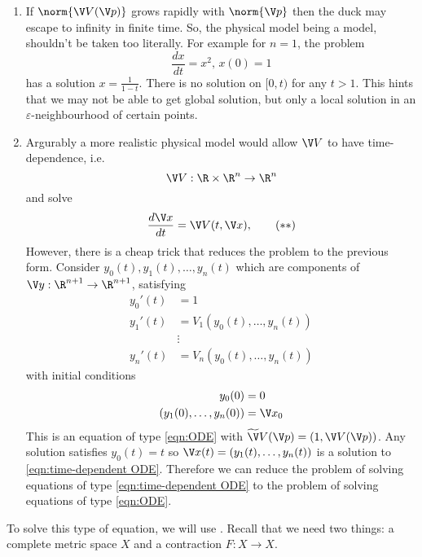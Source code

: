 \documentclass[a4paper]{article}
\theoremstyle{definition}
\begin{document}
\begin{remark}\leavevmode
  \begin{enumerate}
  \item If \(\norm{\V V(\V p)}\) grows rapidly with \(\norm{\V p}\) then the duck may escape to infinity in finite time. So, the physical model being a model, shouldn't be taken too literally. For example for \(n = 1\), the problem
    \[
      \frac{dx}{dt} = x^2, \, x(0) = 1
    \]
    has a solution \(x = \frac{1}{1 - t}\). There is no solution on \([0, t)\) for any \(t > 1\). This hints that we may not be able to get global solution, but only a local solution in an \(\varepsilon\)-neighbourhood of certain points.
  \item Argurably a more realistic physical model would allow \(\V V\) to have time-dependence, i.e.
    \[
      \V V: \R \times \R^n \to \R^n
    \]
    and solve
    \begin{equation*}
      \label{eqn:time-dependent ODE}
      \frac{d \V x}{dt} = \V V(t, \V x),
      \tag{\(\ast\ast\)}
    \end{equation*}
    However, there is a cheap trick that reduces the problem to the previous form. Consider \(y_0(t), y_1(t), \dots, y_n(t)\) which are components of \(\V y: \R^{n + 1} \to \R^{n + 1}\), satisfying
    \begin{align*}
      y_0'(t) &= 1 \\
      y_1'(t) &= V_1(y_0(t), \dots, y_n(t)) \\
              & \vdots \\
      y_n'(t) &= V_n(y_0(t), \dots, y_n(t))
    \end{align*}
    with initial conditions
    \begin{align*}
      y_0(0) &= 0 \\
      (y_1(0), \dots, y_n(0)) &= \V x_0
    \end{align*}
    This is an equation of type \eqref{eqn:ODE} with \(\widetilde \V V(\V p) = (1, \V V(\V p))\). Any solution satisfies \(y_0(t) = t\) so \(\V x(t) = (y_1(t), \dots, y_n(t))\) is a solution to \eqref{eqn:time-dependent ODE}.
    Therefore we can reduce the problem of solving equations of type \eqref{eqn:time-dependent ODE} to the problem of solving equations of type \eqref{eqn:ODE}.
  \end{enumerate}
\end{remark}

To solve this type of equation, we will use . Recall that we need two things: a complete metric space \(X\) and a contraction \(F: X \to X\).
\end{document}
